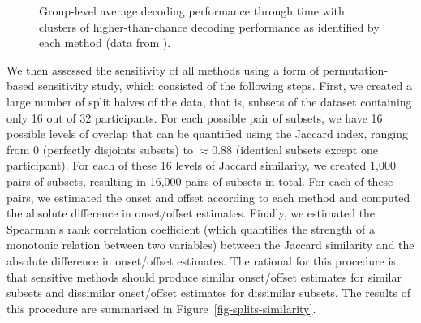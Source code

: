 \documentclass[
  doc,
  floatsintext,
  longtable,
  a4paper,
  nolmodern,
  notxfonts,
  notimes,
  colorlinks=true,linkcolor=blue,citecolor=blue,urlcolor=blue]{apa7}
\begin{document}
\begin{figure}[!htb]

\caption{\label{fig-onset-offset}Group-level average decoding
performance through time with clusters of higher-than-chance decoding
performance as identified by each method (data from
).}


\end{figure}%

We then assessed the sensitivity of all methods using a form of
permutation-based sensitivity study, which consisted of the following
steps. First, we created a large number of split halves of the data,
that is, subsets of the dataset containing only 16 out of 32
participants. For each possible pair of subsets, we have 16 possible
levels of overlap that can be quantified using the Jaccard index,
ranging from 0 (perfectly disjoints subsets) to \(\approx0.88\)
(identical subsets except one participant). For each of these 16 levels
of Jaccard similarity, we created 1,000 pairs of subsets, resulting in
16,000 pairs of subsets in total. For each of these pairs, we estimated
the onset and offset according to each method and computed the absolute
difference in onset/offset estimates. Finally, we estimated the
Spearman's rank correlation coefficient (which quantifies the strength
of a monotonic relation between two variables) between the Jaccard
similarity and the absolute difference in onset/offset estimates. The
rational for this procedure is that sensitive methods should produce
similar onset/offset estimates for similar subsets and dissimilar
onset/offset estimates for dissimilar subsets. The results of this
procedure are summarised in Figure~\ref{fig-splits-similarity}.
\end{document}
